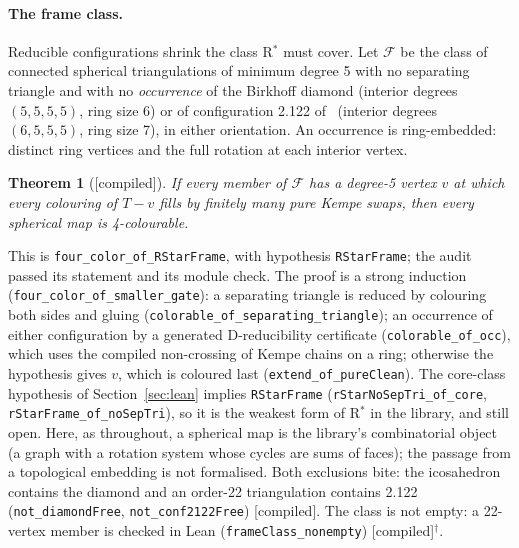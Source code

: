 \documentclass[11pt]{article}
\newtheorem{theorem}{Theorem}\newtheorem{lemma}{Lemma}\newtheorem{conjecture}{Conjecture}
\newcommand{\lab}[1]{\textsf{[#1]}}
\begin{document}
\paragraph{The frame class.} Reducible configurations shrink the class R$^\ast$ must cover. Let $\mathcal F$ be the class of connected spherical triangulations of minimum degree 5 with no separating triangle and with no \emph{occurrence} of the Birkhoff diamond (interior degrees $(5,5,5,5)$, ring size 6) or of configuration 2.122 of~\cite{robertson1997} (interior degrees $(6,5,5,5)$, ring size 7), in either orientation. An occurrence is ring-embedded: distinct ring vertices and the full rotation at each interior vertex.
\begin{theorem}[\lab{compiled}]\label{thm:frame}
If every member of $\mathcal F$ has a degree-5 vertex $v$ at which every colouring of $T-v$ fills by finitely many pure Kempe swaps, then every spherical map is 4-colourable.
\end{theorem}
This is \texttt{four\_color\_of\_RStarFrame}, with hypothesis \texttt{RStarFrame}; the audit passed its statement and its module check. The proof is a strong induction (\texttt{four\_color\_of\_smaller\_gate}): a separating triangle is reduced by colouring both sides and gluing (\texttt{colorable\_of\_separating\_triangle}); an occurrence of either configuration by a generated D-reducibility certificate (\texttt{colorable\_of\_occ}), which uses the compiled non-crossing of Kempe chains on a ring; otherwise the hypothesis gives $v$, which is coloured last (\texttt{extend\_of\_pureClean}). The core-class hypothesis of Section~\ref{sec:lean} implies \texttt{RStarFrame} (\texttt{rStarNoSepTri\_of\_core}, \texttt{rStarFrame\_of\_noSepTri}), so it is the weakest form of R$^\ast$ in the library, and still open. Here, as throughout, a spherical map is the library's combinatorial object (a graph with a rotation system whose cycles are sums of faces); the passage from a topological embedding is not formalised. Both exclusions bite: the icosahedron contains the diamond and an order-22 triangulation contains 2.122 (\texttt{not\_diamondFree}, \texttt{not\_conf2122Free}) \lab{compiled}. The class is not empty: a 22-vertex member is checked in Lean (\texttt{frameClass\_nonempty}) \lab{compiled}$^\dagger$.
\end{document}
